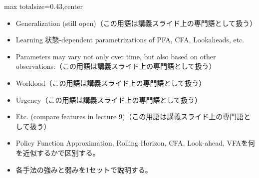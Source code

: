 \clearpage
{}
\begin{minipage}[t]{0.405\textwidth}
\begin{adjustbox}{max totalsize={\textwidth}{0.43\textheight},center}
\begin{minipage}{\textwidth}\scriptsize
{}\begin{itemize}
\item Generalization (still open)（この用語は講義スライド上の専門語として扱う）
\item Learning 状態-dependent parametrizations of PFA, CFA, Lookaheads, etc.
\item Parameters may vary not only over time, but also based on other observations:（この用語は講義スライド上の専門語として扱う）
\item Workload（この用語は講義スライド上の専門語として扱う）
\item Urgency（この用語は講義スライド上の専門語として扱う）
\item Etc. (compare features in lecture 9)（この用語は講義スライド上の専門語として扱う）
\end{itemize}\begin{itemize}
\item Policy Function Approximation, Rolling Horizon, CFA, Look-ahead, VFAを何を近似するかで区別する。
\item 各手法の強みと弱みを1セットで説明する。
\end{itemize}
\end{minipage}
\end{adjustbox}
\end{minipage}\hfill
